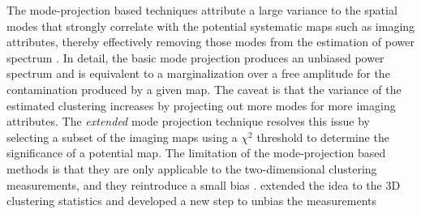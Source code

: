 \documentclass[fleqn, usenatbib]{mnras}
\begin{document}
The mode-projection based techniques attribute a large variance to the spatial modes that strongly correlate with the potential systematic maps such as imaging attributes, thereby effectively removing those modes from the estimation of power spectrum \citep[see e.g.][]{rybicki1992interpolation,tegmark1997measure,tegmark1998measuring,slosar2004exact,ho2008correlation, pullen2013systematic,leistedt2013estimating,leistedt2014exploiting}. In detail, the basic mode projection \citep{leistedt2013estimating} produces an unbiased power spectrum and is equivalent to a marginalization over a free amplitude for the contamination produced by a given map.
 The caveat is that the variance of the estimated clustering increases by projecting out more modes for more imaging attributes. The \textit{extended} mode projection technique \citep{leistedt2014exploiting} resolves this issue by selecting a subset of the imaging maps using a $\chi^{2}$ threshold to determine the significance of a potential map. The limitation of the mode-projection based methods is that they are only applicable to the two-dimensional clustering measurements, and they reintroduce a small bias \citep{elsner2015unbiased}. \citet{kalus2016unbiased} extended the idea to the 3D clustering statistics and developed a new step to unbias the measurements~\citep[for an application on SDSS-III BOSS data see e.g.,][]{kalus2018map}\\
\end{document}
